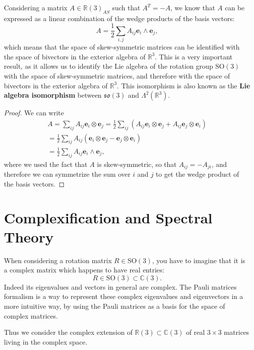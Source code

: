 Considering a matrix \(A \in \mathbb{R}(3)_{AS}\) such that \(A^T = -A\), we know that \(A\) can be expressed as a linear combination of the wedge products of the basis vectors:
\[
    A = \frac{1}{2} \sum_{i, j} A_{ij} \mathbf{e}_i \wedge \mathbf{e}_j,
\]
which means that the space of skew-symmetric matrices can be identified with the space of bivectors in the exterior algebra of \(\mathbb{R}^3\). This is a very important result, as it allows us to identify the Lie algebra of the rotation group \(\mathrm{SO}(3)\) with the space of skew-symmetric matrices, and therefore with the space of bivectors in the exterior algebra of \(\mathbb{R}^3\). This isomorphism is also known as the \textbf{Lie algebra isomorphism} between \(\mathfrak{so}(3)\) and \(\Lambda^2(\mathbb{R}^3)\).

\begin{proof}
    We can write
    \[
        \begin{aligned}
            A = \sum_{ij} A_{ij} \mathbf{e}_i \otimes \mathbf{e}_j = \frac{1}{2} \sum_{ij} (A_{ij} \mathbf{e}_i \otimes \mathbf{e}_j + A_{ij} \mathbf{e}_j \otimes \mathbf{e}_i) \\
            = \frac{1}{2} \sum_{ij} A_{ij} (\mathbf{e}_i \otimes \mathbf{e}_j - \mathbf{e}_j \otimes \mathbf{e}_i)                                                               \\
            = \frac{1}{2} \sum_{ij} A_{ij} \mathbf{e}_i \wedge \mathbf{e}_j,
        \end{aligned}
    \]
    where we used the fact that \(A\) is skew-symmetric, so that \(A_{ij} = - A_{ji}\), and therefore we can symmetrize the sum over \(i\) and \(j\) to get the wedge product of the basis vectors.
\end{proof}

\section{Complexification and Spectral Theory}

When considering a rotation matrix \(R \in \mathrm{SO}(3)\), you have to imagine that it is a complex matrix which happens to have real entries:
\[
    R \in \mathrm{SO}(3) \subset \mathbb{C}(3).
\]
Indeed its eigenvalues and vectors in general are complex. The Pauli matrices formalism is a way to represent these complex eigenvalues and eigenvectors in a more intuitive way, by using the Pauli matrices as a basis for the space of complex matrices.

Thus we consider the complex extension of \(\mathbb{R}(3) \subset \mathbb{C}(3)\) of real \(3 \times 3\) matrices living in the complex space.

